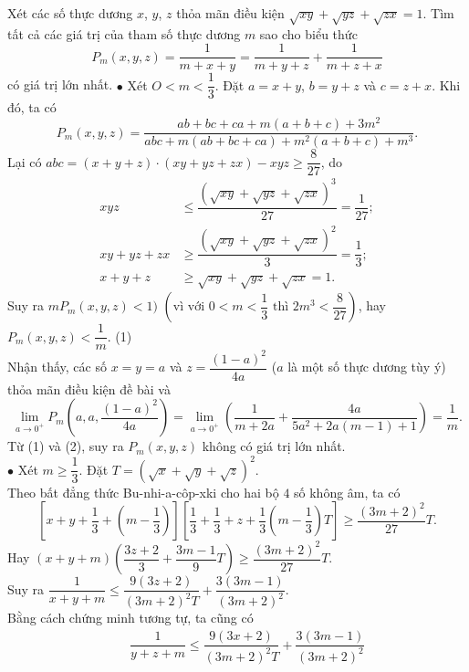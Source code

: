 \begin{bt}%
	Xét các số thực dương $x$, $y$, $z$ thỏa mãn điều kiện $\sqrt{xy} + \sqrt{yz} + \sqrt{zx} = 1$. Tìm tất cả các giá trị của tham số thực dương $m$ sao cho biểu thức $$P_m(x,y,z) = \dfrac{1}{m+x+y} = \dfrac{1}{m+y+z} + \dfrac{1}{m+z+x}$$ có giá trị lớn nhất.
	\loigiai
	{
		$\bullet$ Xét $O<m<\dfrac{1}{3}$. Đặt $a=x+y$, $b=y+z$ và $c=z+x$. Khi đó, ta có $$P_m(x,y,z) = \dfrac{ab+bc+ca+m(a+b+c)+3m^2}{abc+m(ab+bc+ca)+m^2(a+b+c)+m^3}.$$
		Lại có $abc = (x+y+z)\cdot(xy+yz+zx) - xyz \geq \dfrac{8}{27}$, do
		{\allowdisplaybreaks
		\begin{align*}
	xyz &\leq \dfrac{\left(\sqrt{xy} + \sqrt{yz} + \sqrt{zx}\right)^3}{27} = \dfrac{1}{27}; \\
		xy+yz+zx &\geq \dfrac{\left(\sqrt{xy} + \sqrt{yz} + \sqrt{zx}\right)^2}{3} = \dfrac{1}{3}; \\
x+y+z &\geq \sqrt{xy} + \sqrt{yz} + \sqrt{zx} = 1.
\end{align*}}Suy ra $m P_m(x,y,z) < 1)$ $\left(\text{vì với } 0<m< \dfrac{1}{3} \text{ thì } 2m^3 < \dfrac{8}{27} \right)$, hay $P_m(x,y,z) < \dfrac{1}{m}$. \hfill (1) \\
		Nhận thấy, các số $x=y=a$ và $z=\dfrac{(1-a)^2}{4a}$ ($a$ là một số thực dương tùy ý) thỏa mãn điều kiện đề bài và 
		\[\displaystyle \lim \limits_{a \to 0^+} P_m \left(a,a, \dfrac{(1-a)^2}{4a}\right) = \displaystyle \lim \limits_{a \to 0^+} \left(\dfrac{1}{m+2a} + \dfrac{4a}{5a^2+2a(m-1)+1}\right) = \dfrac{1}{m}.\tag{2}\]
		Từ (1) và (2), suy ra $P_m(x,y,z)$ không có giá trị lớn nhất.\\
		$\bullet$ Xét $m\geq \dfrac{1}{3}$. Đặt $T= \left(\sqrt{x} + \sqrt{y} + \sqrt{z}\right)^2$. \\
		Theo bất đẳng thức Bu-nhi-a-côp-xki cho hai bộ $4$ số không âm,
		ta có 
		$$\left[x+y+\dfrac{1}{3}+\left(m-\dfrac{1}{3}\right) \right] \left[\dfrac{1}{3} + \dfrac{1}{3} + z + \dfrac{1}{3} \left(m-\dfrac{1}{3}\right)T \right] \geq \dfrac{(3m+2)^2}{27}T.$$
		Hay $(x+y+m)\left(\dfrac{3z+2}{3}+\dfrac{3m-1}{9}T\right) \geq \dfrac{(3m+2)^2}{27}T$. \\
		Suy ra $\dfrac{1}{x+y+m} \leq \dfrac{9(3z+2)}{(3m+2)^2T}+\dfrac{3(3m-1)}{(3m+2)^2}$. \\
		Bằng cách chứng minh tương tự, ta cũng có
		{\allowdisplaybreaks
		\begin{eqnarray*}
			& & \dfrac{1}{y+z+m} \leq \dfrac{9(3x+2)}{(3m+2)^2T}+\dfrac{3(3m-1)}{(3m+2)^2} \\

\end{eqnarray*}}}
\end{bt}
